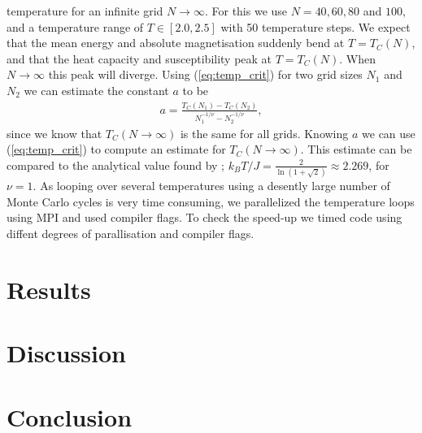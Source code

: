 \documentclass[twocolumn]{aastex62}
\begin{document}
temperature for an infinite grid $N\to \infty$. For this we use $N = 40, 60, 80$
and $100$, and a temperature range of $T\in[2.0, 2.5]$ with 50 temperature steps. We expect that the mean energy
and absolute magnetisation suddenly bend at $T = T_C(N)$, and that the heat
capacity and susceptibility peak at $T = T_C(N)$. When $N\to\infty$ this peak
will diverge. Using (\ref{eq:temp_crit}) for two grid sizes $N_1$ and $N_2$ we
can estimate the constant $a$ to be 
\begin{align}
	a = \frac{T_C(N_1) - T_C(N_2)}{N_1^{-1/\nu} - N_2^{-1/\nu}},
\end{align}
since we know that $T_C(N\to\infty)$ is the same for all grids. Knowing $a$ we
can use (\ref{eq:temp_crit}) to compute an estimate for $T_C(N\to\infty)$. This
estimate can be compared to the analytical value found by \cite{onsager:1944};
$k_BT/J = \frac{2}{\ln(1+\sqrt{2})}\approx 2.269$, for $\nu = 1$.
As looping over several temperatures using a desently large number of Monte
Carlo cycles is very time consuming, we parallelized the temperature loops using
MPI and used compiler flags. To check the speed-up we timed code using diffent
degrees of parallisation and compiler flags.


\section{Results} \label{sec:results}

\begin{figure*}
	\texttt{[image: \{Figures/thermo\_quants]}.pdf}
	\caption{}
	\label{fig:thermo_quants}
\end{figure*}

\section{Discussion} \label{sec:discussion}

\section{Conclusion} \label{sec:conclusion}




\end{document}

